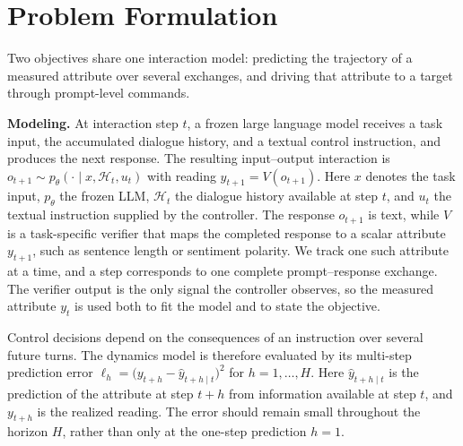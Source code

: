 \section{Problem Formulation}
\label{sec:problem}

Two objectives share one interaction model: predicting the trajectory of a measured attribute over several exchanges, and driving that attribute to a target through prompt-level commands.

\textbf{Modeling.}\label{sec:problem_modeling}
At interaction step \(t\), a frozen large language model receives a task input, the accumulated dialogue history, and a textual control instruction, and produces the next response. The resulting input--output interaction is
\(o_{t+1}\sim p_{\theta}(\cdot\mid x,\mathcal{H}_t,u_t)\) with reading \(y_{t+1}=V(o_{t+1})\).\label{eq:interaction}  %
Here \(x\) denotes the task input, \(p_{\theta}\) the frozen LLM, \(\mathcal{H}_t\) the dialogue history available at step \(t\), and \(u_t\) the textual instruction supplied by the controller. The response \(o_{t+1}\) is text, while \(V\) is a task-specific verifier that maps the completed response to a scalar attribute \(y_{t+1}\), such as sentence length or sentiment polarity. We track one such attribute at a time, and a step corresponds to one complete prompt--response exchange. The verifier output is the only signal the controller observes, so the measured attribute \(y_t\) is used both to fit the model and to state the objective.

Control decisions depend on the consequences of an instruction over several future turns. The dynamics model is therefore evaluated by its multi-step prediction error \(\ell_h=\bigl(y_{t+h}-\widehat y_{t+h\mid t}\bigr)^2\) for \(h=1,\ldots,H\). Here \(\widehat y_{t+h\mid t}\) is the prediction of the attribute at step \(t+h\) from information available at step \(t\), and \(y_{t+h}\) is the realized reading. The error should remain small throughout the horizon \(H\), rather than only at the one-step prediction \(h=1\).

